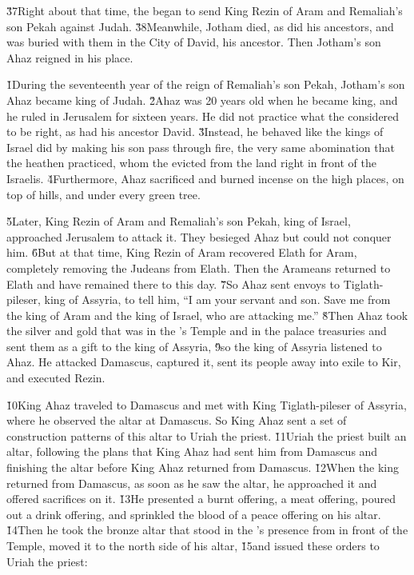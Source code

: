 \v{37}Right about that time, the  began to send King Rezin of Aram and Remaliah's son Pekah against Judah. \v{38}Meanwhile, Jotham died, as did his ancestors, and was buried with them in the City of David, his ancestor. Then Jotham's son Ahaz reigned in his place.

\v{1}During the seventeenth year of the reign of Remaliah's son Pekah, Jotham's son Ahaz became king of Judah. \v{2}Ahaz was 20 years old when he became king, and he ruled in Jerusalem for sixteen years. He did not practice what the  considered to be right, as had his ancestor David. \v{3}Instead, he behaved like the kings of Israel did by making his son pass through fire, the very same abomination that the heathen practiced, whom the  evicted from the land right in front of the Israelis. \v{4}Furthermore, Ahaz sacrificed and burned incense on the high places, on top of hills, and under every green tree.

\v{5}Later, King Rezin of Aram and Remaliah's son Pekah, king of Israel, approached Jerusalem to attack it. They besieged Ahaz but could not conquer him. \v{6}But at that time, King Rezin of Aram recovered Elath for Aram, completely removing the Judeans from Elath. Then the Arameans returned to Elath and have remained there to this day. \v{7}So Ahaz sent envoys to Tiglath-pileser, king of Assyria, to tell him, ``I am your servant and son. Save me from the king of Aram and the king of Israel, who are attacking me.'' \v{8}Then Ahaz took the silver and gold that was in the 's Temple and in the palace treasuries and sent them as a gift to the king of Assyria, \v{9}so the king of Assyria listened to Ahaz. He attacked Damascus, captured it, sent its people away into exile to Kir, and executed Rezin.

\v{10}King Ahaz traveled to Damascus and met with King Tiglath-pileser of Assyria, where he observed the altar at Damascus. So King Ahaz sent a set of construction patterns of this altar to Uriah the priest. \v{11}Uriah the priest built an altar, following the plans that King Ahaz had sent him from Damascus and finishing the altar before King Ahaz returned from Damascus. \v{12}When the king returned from Damascus, as soon as he saw the altar, he approached it and offered sacrifices on it. \v{13}He presented a burnt offering, a meat offering, poured out a drink offering, and sprinkled the blood of a peace offering on his altar. \v{14}Then he took the bronze altar that stood in the 's presence from in front of the Temple, moved it to the north side of his altar, \v{15}and issued these orders to Uriah the priest:


